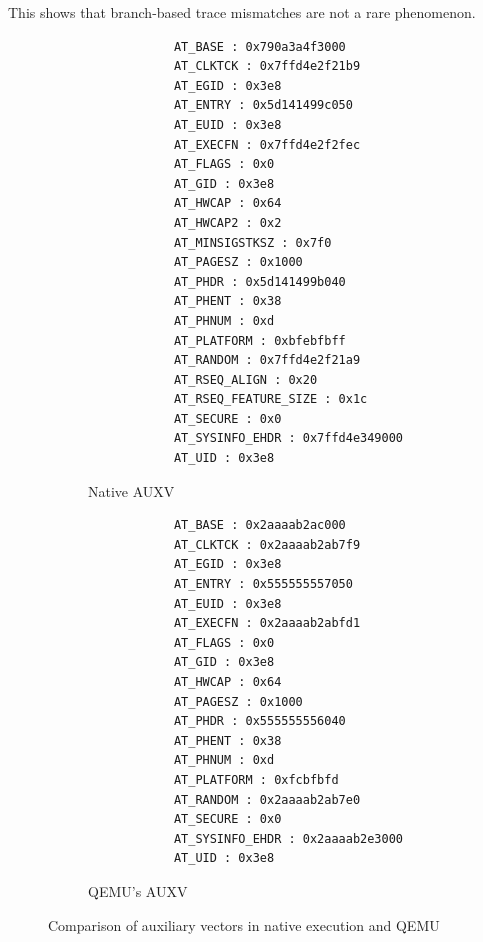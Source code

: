 This shows that branch-based trace mismatches are not a rare phenomenon.

\begin{figure}[htpb]
    \begin{subfigure}[t]{0.4\linewidth}
        \begin{lstlisting}
            AT_BASE : 0x790a3a4f3000
            AT_CLKTCK : 0x7ffd4e2f21b9
            AT_EGID : 0x3e8
            AT_ENTRY : 0x5d141499c050
            AT_EUID : 0x3e8
            AT_EXECFN : 0x7ffd4e2f2fec
            AT_FLAGS : 0x0
            AT_GID : 0x3e8
            AT_HWCAP : 0x64
            AT_HWCAP2 : 0x2
            AT_MINSIGSTKSZ : 0x7f0
            AT_PAGESZ : 0x1000
            AT_PHDR : 0x5d141499b040
            AT_PHENT : 0x38
            AT_PHNUM : 0xd
            AT_PLATFORM : 0xbfebfbff
            AT_RANDOM : 0x7ffd4e2f21a9
            AT_RSEQ_ALIGN : 0x20
            AT_RSEQ_FEATURE_SIZE : 0x1c
            AT_SECURE : 0x0
            AT_SYSINFO_EHDR : 0x7ffd4e349000
            AT_UID : 0x3e8
        \end{lstlisting}
    \caption{Native AUXV}
    \label{fig:native_auxv}
    \end{subfigure}
    \hfill
    \begin{subfigure}[t]{0.4\linewidth}
        \begin{lstlisting}
            AT_BASE : 0x2aaaab2ac000
            AT_CLKTCK : 0x2aaaab2ab7f9
            AT_EGID : 0x3e8
            AT_ENTRY : 0x555555557050
            AT_EUID : 0x3e8
            AT_EXECFN : 0x2aaaab2abfd1
            AT_FLAGS : 0x0
            AT_GID : 0x3e8
            AT_HWCAP : 0x64
            AT_PAGESZ : 0x1000
            AT_PHDR : 0x555555556040
            AT_PHENT : 0x38
            AT_PHNUM : 0xd
            AT_PLATFORM : 0xfcbfbfd
            AT_RANDOM : 0x2aaaab2ab7e0
            AT_SECURE : 0x0
            AT_SYSINFO_EHDR : 0x2aaaab2e3000
            AT_UID : 0x3e8
        \end{lstlisting}
        \caption{QEMU's AUXV}
        \label{fig:qemu_auxv}
    \end{subfigure}
    \caption{Comparison of auxiliary vectors in native execution and QEMU}
    \label{fig:auxv_comparison}
\end{figure}
